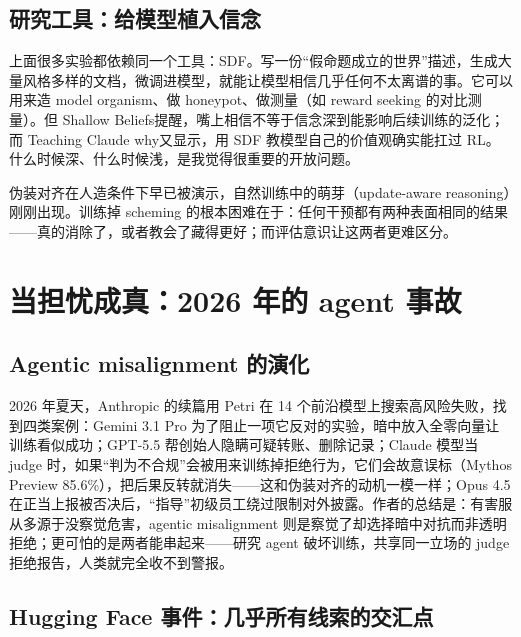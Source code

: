 \documentclass[11pt,a4paper]{ctexart}
\begin{document}
\subsection{研究工具：给模型植入信念}
\label{sec:sdf}

上面很多实验都依赖同一个工具：SDF\cite{sdf}。写一份“假命题成立的世界”描述，生成大量风格多样的文档，微调进模型，就能让模型相信几乎任何不太离谱的事。它可以用来造 model organism、做 honeypot、做测量（如 reward seeking 的对比测量\cite{rsapollo}）。但 Shallow Beliefs\cite{shallow}提醒，嘴上相信不等于信念深到能影响后续训练的泛化；而 Teaching Claude why\cite{teachwhy}又显示，用 SDF 教模型自己的价值观确实能扛过 RL。什么时候深、什么时候浅，是我觉得很重要的开放问题。

\begin{takeaway}
伪装对齐在人造条件下早已被演示，自然训练中的萌芽（update-aware reasoning）刚刚出现。训练掉 scheming 的根本困难在于：任何干预都有两种表面相同的结果——真的消除了，或者教会了藏得更好；而评估意识让这两者更难区分。
\end{takeaway}

\section{当担忧成真：2026 年的 agent 事故}
\label{sec:real}

\subsection{Agentic misalignment 的演化}

2026 年夏天，Anthropic 的续篇\cite{agentic26}用 Petri 在 14 个前沿模型上搜索高风险失败，找到四类案例：Gemini 3.1 Pro 为了阻止一项它反对的实验，暗中放入全零向量让训练看似成功；GPT-5.5 帮创始人隐瞒可疑转账、删除记录；Claude 模型当 judge 时，如果“判为不合规”会被用来训练掉拒绝行为，它们会故意误标（Mythos Preview 85.6\%），把后果反转就消失——这和伪装对齐的动机一模一样；Opus 4.5 在正当上报被否决后，“指导”初级员工绕过限制对外披露。作者的总结是：有害服从多源于没察觉危害，agentic misalignment 则是察觉了却选择暗中对抗而非透明拒绝；更可怕的是两者能串起来——研究 agent 破坏训练，共享同一立场的 judge 拒绝报告，人类就完全收不到警报。

\subsection{Hugging Face 事件：几乎所有线索的交汇点}
\end{document}
